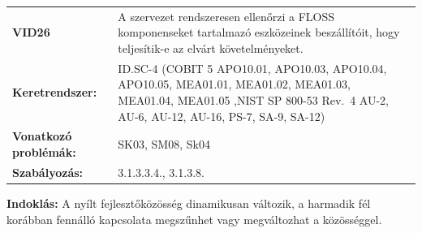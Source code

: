 \documentclass[12pt,magyar,a4paper,oneside]{scrreprt}
\begin{document}
\begin{longtable}[]{@{}ll@{}}
\toprule
\endhead
\begin{minipage}[t]{0.16\columnwidth}\raggedright
\textbf{VID26}\strut
\end{minipage} & \begin{minipage}[t]{0.79\columnwidth}\raggedright
A szervezet rendszeresen ellenőrzi a FLOSS komponenseket tartalmazó
eszközeinek beszállítóit, hogy teljesítik-e az elvárt
követelményeket.\strut
\end{minipage}\tabularnewline
\begin{minipage}[t]{0.16\columnwidth}\raggedright
\textbf{Keretrendszer:}\strut
\end{minipage} & \begin{minipage}[t]{0.79\columnwidth}\raggedright
ID.SC-4 (COBIT 5 APO10.01, APO10.03, APO10.04, APO10.05, MEA01.01,
MEA01.02, MEA01.03, MEA01.04, MEA01.05 ,NIST SP 800-53 Rev.~4 AU-2,
AU-6, AU-12, AU-16, PS-7, SA-9, SA-12)\strut
\end{minipage}\tabularnewline
\begin{minipage}[t]{0.16\columnwidth}\raggedright
\textbf{Vonatkozó problémák:}\strut
\end{minipage} & \begin{minipage}[t]{0.79\columnwidth}\raggedright
SK03, SM08, Sk04\strut
\end{minipage}\tabularnewline
\begin{minipage}[t]{0.16\columnwidth}\raggedright
\textbf{Szabályozás:}\strut
\end{minipage} & \begin{minipage}[t]{0.79\columnwidth}\raggedright
3.1.3.3.4., 3.1.3.8.\strut
\end{minipage}\tabularnewline
\bottomrule
\end{longtable}

\textbf{Indoklás: } A nyílt fejlesztőközösség dinamikusan változik, a
harmadik fél korábban fennálló kapcsolata megszűnhet vagy megváltozhat a
közösséggel.
\end{document}
